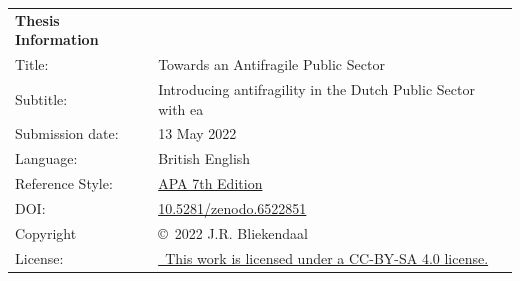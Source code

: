 \thispagestyle{plain}
	
	\begin{tabular}{p{}p{}}
		\textbf{Thesis Information} & \\
		Title: & Towards an Antifragile Public Sector \\
		Subtitle: & Introducing \Gls{antifragility} in the Dutch Public Sector with \gls{ea} \\
		Submission date: & 13 May 2022 \\
		Language: & British English \\
		Reference Style: & \href{https://apastyle.apa.org/products/publication-manual-7th-edition}{APA 7th Edition}\\
		DOI: & \href{https://www.doi.org/10.5281/zenodo.6522851/}{10.5281/zenodo.6522851} \\
		Copyright & \copyright\ 2022 J.R. Bliekendaal\\
		License: & \href{https://creativecommons.org/licenses/by-sa/4.0/}{\ccbysa\ This work is licensed under a CC-BY-SA 4.0 license.}\\
	\end{tabular}

